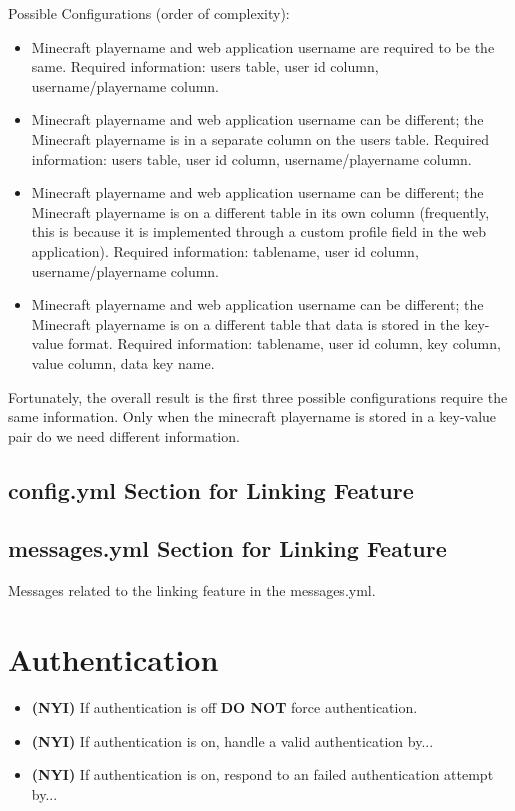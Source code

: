 \documentclass[letterpaper,12pt]{article}
\begin{document}
  Possible Configurations (order of complexity):
  \begin{itemize}
    \item Minecraft playername and web application username are required to be
      the same. Required information: users table, user id column,
      username/playername column.
    \item Minecraft playername and web application username can be different;
      the Minecraft playername is in a separate column on the users table.
      Required information: users table, user id column, username/playername
      column.
    \item Minecraft playername and web application username can be different;
      the Minecraft playername is on a different table in its own column
      (frequently, this is because it is implemented through a custom profile
      field in the web application). Required information: tablename, user id
      column, username/playername column.
    \item Minecraft playername and web application username can be different;
      the Minecraft playername is on a different table that data is stored in
      the key-value format. Required information: tablename, user id column,
      key column, value column, data key name.
  \end{itemize}

  Fortunately, the overall result is the first three possible configurations
  require the same information. Only when the minecraft playername is stored in
  a key-value pair do we need different information.
  
  \clearpage
  
  \subsection{config.yml Section for Linking Feature}
  
  
  \subsection{messages.yml Section for Linking Feature}
  Messages related to the linking feature in the messages.yml.
  

  \clearpage
  \section{Authentication}
  \begin{itemize}
      \item {\bf (NYI)} If authentication is off {\bf DO NOT} force authentication.
    \item {\bf (NYI)} If authentication is on, handle a valid authentication by...
    \item {\bf (NYI)} If authentication is on, respond to an failed authentication attempt by...
\end{itemize}
\end{document}
